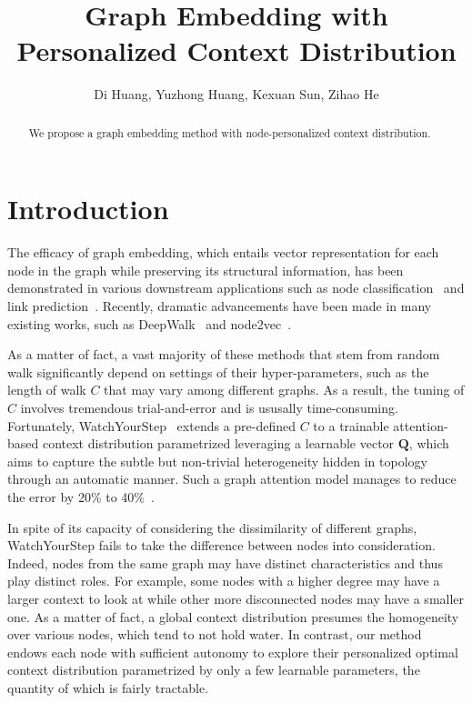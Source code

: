\documentclass{article}
\title{Graph Embedding with Personalized Context Distribution}
\author{
Di Huang, Yuzhong Huang, Kexuan Sun, Zihao He}
\begin{document}
\maketitle

\begin{abstract}
    We propose a graph embedding method with node-personalized context distribution. 
\end{abstract}

\section{Introduction}
The efficacy of graph embedding, which entails vector representation for each node in the graph while preserving its structural information, has been demonstrated in various downstream applications such as node classification~\cite{} and link prediction~\cite{}.
Recently, dramatic advancements have been made in many existing works, such as DeepWalk~\cite{} and node2vec~\cite{}. 

As a matter of fact, a vast majority of these methods that stem from random walk significantly depend on settings of their hyper-parameters, such as the length of walk $C$ that may vary among different graphs. As a result, the tuning of $C$ involves tremendous trial-and-error and is ususally time-consuming.
Fortunately, WatchYourStep~\cite{} extends a pre-defined $C$ to a trainable attention-based context distribution parametrized leveraging a learnable vector $\mathbf{Q}$, which aims to capture the subtle but non-trivial heterogeneity hidden in topology through an automatic manner. Such a graph attention model manages to reduce the error by 20\% to 40\%~\cite{}.

In spite of its capacity of considering the dissimilarity of different graphs, WatchYourStep fails to take the difference between nodes into consideration. Indeed, nodes from the same graph may have distinct characteristics and thus play distinct roles. 
For example, some nodes with a higher degree may have a larger context to look at while other more disconnected nodes may have a smaller one. As a matter of fact, a global context distribution presumes the homogeneity over various nodes, which tend to not hold water. In contrast, our method endows each node with sufficient autonomy to explore their personalized optimal context distribution parametrized by only a few learnable parameters, the quantity of which is fairly tractable.
\end{document}
